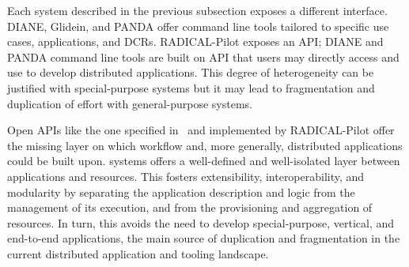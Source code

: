 \documentclass{sig-alternate}
\begin{document}








Each \pilot system described in the previous subsection exposes a different
interface.  DIANE, Glidein, and PANDA offer command
line tools tailored
to specific use cases, applications, and DCRs. RADICAL-Pilot exposes an API;
DIANE and PANDA command line tools are built on API that users may directly
access and use to develop distributed applications. This degree of heterogeneity
can be justified with special-purpose \pilot systems but it may lead to
fragmentation and duplication of effort with general-purpose
systems. 

Open APIs like the one specified in~\cite{luckow2012towards} and implemented by
RADICAL-Pilot offer the missing layer on which workflow and, more generally,
distributed applications could be built upon. %
\pilot systems offers a well-defined and well-isolated layer between
applications and resources. This fosters extensibility, interoperability, and
modularity by separating the application description and logic from the
management of its execution, and from the provisioning and aggregation of
resources. In turn, this avoids the need to develop special-purpose, vertical,
and end-to-end applications, the main source of duplication and fragmentation in
the current distributed application and tooling landscape. 
\end{document}
